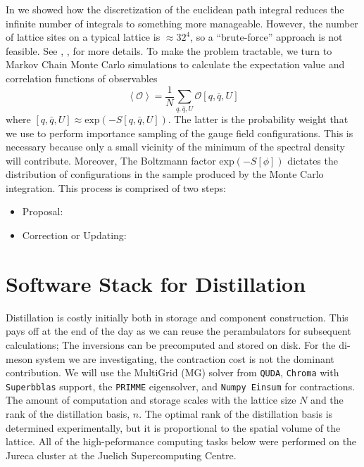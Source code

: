 In  we showed how the discretization of the euclidean path integral reduces the infinite number of integrals to something more manageable. However, the number of lattice sites on a typical lattice is $\approx32^4$, so a ``brute-force'' approach is not feasible. See \cite{Montvay_Münster_1994}, \cite{Luscher:2010ae},\cite{Creutz:1988wv} \cite{Finkenrath:2023sjg} for more details. To make the problem tractable, we turn to Markov Chain Monte Carlo simulations to calculate the expectation value and correlation functions of observables 
\begin{equation}
  \left<\mathcal{O}\right> = \frac{1}{N} \sum_{q,\bar{q},U}^{} \mathcal{O}\left[q,\bar{q},U\right] 
\end{equation} where $\left[q,\bar{q},U\right] \approx \text{exp}(-S[q,\bar{q},U])$. The latter is the probability weight that we use to perform importance sampling of the gauge field configurations. This is necessary because only a small vicinity of the minimum of the spectral density will contribute. Moreover, The Boltzmann factor $\text{exp}(-S[\phi])$ dictates the distribution of configurations in the sample produced by the Monte Carlo integration. This process is comprised of two steps: 
\begin{itemize}
  \item Proposal: 
  \item Correction or Updating: 
\end{itemize} 


\section{Software Stack for Distillation}
Distillation is costly initially both in storage and component construction. This pays off at the end of the day as we can reuse the perambulators for subsequent calculations; The inversions can be precomputed and stored on disk. For the di-meson system we are investigating, the contraction cost is not the dominant contribution. We will use the MultiGrid (MG) solver from \texttt{QUDA}, \texttt{Chroma} with \texttt{Superbblas} support, the \texttt{PRIMME} eigensolver, and \texttt{Numpy Einsum} for contractions. The amount of computation and storage scales with the lattice size $N$ and the rank of the distillation basis, $n$. The optimal rank of the distillation basis is determined experimentally, but it is proportional to the spatial volume of the lattice. All of the high-peformance computing tasks below were performed on the Jureca cluster at the Juelich Supercomputing Centre. 
